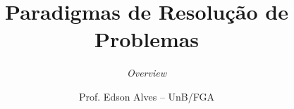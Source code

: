 \title{Paradigmas de Resolução de Problemas}
\subtitle{\it Overview}
\author{Prof. Edson Alves -- UnB/FGA}
\date{}
